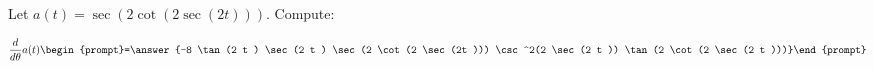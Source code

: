 \documentclass{ximera}
\author{Bart Snapp}
\begin{document}
\begin{exercise}
Let $a(t) = \sec (2 \cot (2 \sec (2 t )))$. Compute:

\[
\frac{d}{d\theta}a(t)
\begin{prompt}=\answer{-8 \tan (2 t ) \sec (2 t ) \sec (2 \cot (2 \sec (2t ))) \csc ^2(2 \sec (2 t )) \tan (2 \cot (2 \sec (2 t )))}\end{prompt}
\]
\end{exercise}
\end{document}
